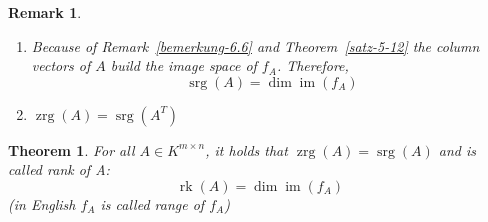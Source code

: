 \documentclass[a4paper,landscape,twocolumn]{article}
\newtheorem{theorem}{Theorem}
\newtheorem{rem}{Remark}
\DeclareMathOperator\image{im} %
\begin{document}
%
\begin{rem}
  \begin{enumerate}
    \item Because of Remark~\ref{bemerkung-6.6} and Theorem~\ref{satz-5-12}
      the column vectors of $A$ build the image space of $f_A$.
      Therefore,
      \[ \operatorname{srg}(A) = \dim \image(f_A) \]
    \item $\operatorname{zrg}(A) = \operatorname{srg}(A^T)$
  \end{enumerate}
\end{rem}
%
\begin{theorem}
  For all $A \in K^{m \times n}$, it holds that $\operatorname{zrg}(A) = \operatorname{srg}(A)$
  and is called \emph{rank} of A:
  \[ \operatorname{rk}(A) = \dim{\image(f_A)} \]
  (in English $f_A$ is called \emph{range} of $f_A$)
\end{theorem}
\end{document}
